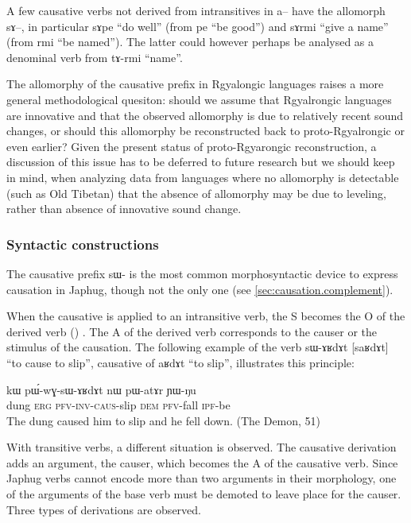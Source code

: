 \documentclass[oldfontcommands,oneside,a4paper,11pt]{article}
\newcommand{\ipa}[1]{{\phon \mbox{#1}}} %
\newcommand{\jg}[1]{\ipa{#1}\index{Japhug #1}}
\newcommand{\pfv}{\textsc{pfv}}
\newcommand{\caus}{\textsc{caus}}
\newcommand{\dem}{\textsc{dem}}
\newcommand{\erg}{\textsc{erg}}
\newcommand{\inv}{\textsc{inv}}
\newcommand{\ipf}{\textsc{ipf}}
\begin{document}
A few causative verbs not derived from intransitives in \ipa{a}-- have the allomorph \ipa{sɤ}--, in particular \ipa{sɤpe} ``do well'' (from \ipa{pe} ``be good'') and \ipa{sɤrmi} ``give a name'' (from \ipa{rmi} ``be named''). The latter could however perhaps be analysed as a denominal verb from \ipa{tɤ-rmi} ``name''.

The allomorphy of the causative prefix in Rgyalongic languages raises a more general methodological quesiton: should we assume that Rgyalrongic languages are innovative and that the observed allomorphy is due to relatively recent sound changes, or should this allomorphy be reconstructed back to proto-Rgyalrongic or even earlier? Given the present status of proto-Rgyarongic reconstruction, a discussion of this issue has to be deferred to future research but we should keep in mind, when analyzing data from languages where no allomorphy is detectable (such as Old Tibetan) that the absence of allomorphy may be due to leveling, rather than absence of innovative sound change.

\subsubsection{Syntactic constructions} \label{subsub:causation}
The causative prefix \ipa{sɯ-} is the most common morphosyntactic device to express causation in Japhug, though not the only one (see \ref{sec:causation.complement}).

When the causative is applied to an intransitive verb, the S becomes the O of the derived verb (\citet[45]{dixon00causative}) . The A of the derived verb corresponds to the causer  or the stimulus of the causation.  The following example of the verb \jg{sɯ-ɤʁdɤt} [saʁdɤt] ``to cause to slip'', causative of \jg{aʁdɤt} ``to slip'', illustrates this principle:
\begin{exe}
\ex
\gll \ipa{tɯqe} 	\ipa{kɯ} 	\ipa{pɯ́-wɣ-sɯ-ɤʁdɤt} 	\ipa{nɯ} 	\ipa{pɯ-atɤr} 	\ipa{ɲɯ-ŋu} \\
dung \erg{} \pfv{}-\inv{}-\caus{}-slip \dem{} \pfv{}-fall \ipf{}-be \\
 \glt The dung caused him to slip and he fell down. (The Demon, 51)
\end{exe} 


With transitive verbs, a different situation is observed. The causative derivation adds an argument, the causer, which becomes the A of the causative verb. Since Japhug verbs cannot encode more than two arguments in their morphology, one of the arguments of the base verb must be demoted to leave place for the causer.  Three types of derivations are observed.
\end{document}
